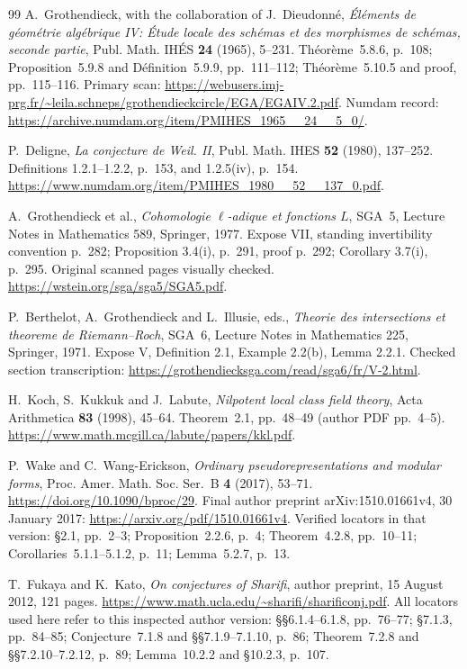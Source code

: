 \documentclass[11pt,a4paper]{article}
\theoremstyle{definition}
\begin{document}
\begin{thebibliography}{99}
A.~Grothendieck, with the collaboration of J.~Dieudonn\'e,
\emph{\'El\'ements de g\'eom\'etrie alg\'ebrique IV:
\'Etude locale des sch\'emas et des morphismes de sch\'emas,
seconde partie}, Publ. Math. IH\'ES \textbf{24} (1965), 5--231.
Th\'eor\`eme~5.8.6, p.~108; Proposition~5.9.8 and
D\'efinition~5.9.9, pp.~111--112;
Th\'eor\`eme~5.10.5 and proof, pp.~115--116.
Primary scan:
\url{https://webusers.imj-prg.fr/~leila.schneps/grothendieckcircle/EGA/EGAIV.2.pdf}.
Numdam record: \url{https://archive.numdam.org/item/PMIHES_1965__24__5_0/}.

P.~Deligne, \emph{La conjecture de Weil. II},
Publ. Math. IHES \textbf{52} (1980), 137--252.
Definitions 1.2.1--1.2.2, p.~153, and 1.2.5(iv), p.~154.
\url{https://www.numdam.org/item/PMIHES_1980__52__137_0.pdf}.


A.~Grothendieck et al., \emph{Cohomologie $\ell$-adique et fonctions $L$},
SGA~5, Lecture Notes in Mathematics 589, Springer, 1977.
Expose VII, standing invertibility convention p.~282; Proposition 3.4(i), p.~291, proof p.~292; Corollary 3.7(i), p.~295. Original scanned pages visually checked.
\url{https://wstein.org/sga/sga5/SGA5.pdf}.


P.~Berthelot, A.~Grothendieck and L.~Illusie, eds.,
\emph{Theorie des intersections et theoreme de Riemann--Roch},
SGA~6, Lecture Notes in Mathematics 225, Springer, 1971.
Expose V, Definition 2.1, Example 2.2(b), Lemma 2.2.1.
Checked section transcription:
\url{https://grothendiecksga.com/read/sga6/fr/V-2.html}.

H.~Koch, S.~Kukkuk and J.~Labute, \emph{Nilpotent local class field theory},
Acta Arithmetica \textbf{83} (1998), 45--64.
Theorem~2.1, pp.~48--49 (author PDF pp.~4--5).
\url{https://www.math.mcgill.ca/labute/papers/kkl.pdf}.

P.~Wake and C.~Wang-Erickson,
\emph{Ordinary pseudorepresentations and modular forms},
Proc. Amer. Math. Soc. Ser.~B \textbf{4} (2017), 53--71.
\url{https://doi.org/10.1090/bproc/29}.
Final author preprint arXiv:1510.01661v4, 30 January 2017:
\url{https://arxiv.org/pdf/1510.01661v4}.
Verified locators in that version: \S2.1, pp.~2--3;
Proposition~2.2.6, p.~4; Theorem~4.2.8, pp.~10--11;
Corollaries~5.1.1--5.1.2, p.~11; Lemma~5.2.7, p.~13.


T.~Fukaya and K.~Kato,
\emph{On conjectures of Sharifi}, author preprint,
15 August 2012, 121 pages.
\url{https://www.math.ucla.edu/~sharifi/sharificonj.pdf}.
All locators used here refer to this inspected author version:
\S\S6.1.4--6.1.8, pp.~76--77;
\S7.1.3, pp.~84--85;
Conjecture~7.1.8 and \S\S7.1.9--7.1.10, p.~86;
Theorem~7.2.8 and \S\S7.2.10--7.2.12, p.~89;
Lemma~10.2.2 and \S10.2.3, p.~107.


\end{thebibliography}
\end{document}
